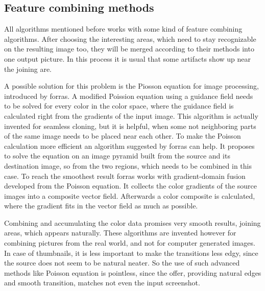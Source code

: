 \documentclass[draft,final]{vutinfth} %
\begin{document}
\subsection{Feature combining methods}
All algorithms mentioned before works with some kind of feature combining algorithms.
After choosing the interesting areas, which need to stay recognizable on the resulting image too, they will be merged according to their methods into one output picture.
In this process it is usual that some artifacts show up near the joining are.\par 
A possible solution for this problem is the Piosson equation for image processing, introduced by forras.
A modified Poission equation using a guidance field needs to be solved for every color in the color space, where the guidance field is calculated right from the gradients of the input image.
This algorithm is actually invented for seamless cloning, but it is helpful, when some not neighboring parts of the same image needs to be placed near each other.
To make the Poisson calculation more efficient an algorithm suggested by forras can help.
It proposes to solve the equation on an image pyramid built from the source and its destination image, so from the two regions, which needs to be combined in this case.
To reach the smoothest result forras works with gradient-domain fusion developed from the Poisson equation.
It collects the color gradients of the source images into a composite vector field.
Afterwards  a color composite is calculated, where the gradient fits in the vector field as much as possible. \par 
Combining and accumulating the color data promises very smooth results, joining areas, which appears naturally.
These algorithms are invented however for combining pictures from the real world, and not for computer generated images.
In case of thumbnails, it is less important to make the transitions less edgy, since the source does not seem to be natural neater. 
So the use of such advanced methods like Poisson equation is pointless, since the offer, providing natural edges and smooth transition, matches not even the input screenshot. 
   
 
\end{document}
